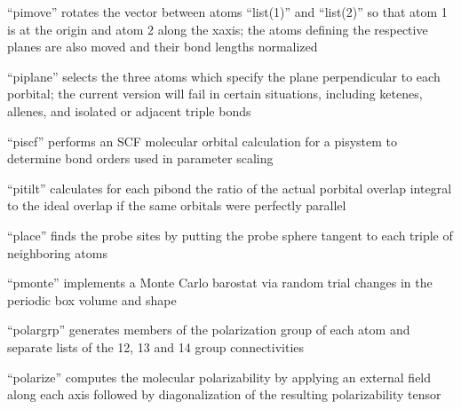 \documentclass[letterpaper,11pt,english]{sphinxmanual}
\begin{document}
\sphinxAtStartPar
{}

\sphinxAtStartPar
“pimove” rotates the vector between atoms “list(1)” and “list(2)” so that atom 1 is at the origin and atom 2 along the x\sphinxhyphen{}axis; the atoms defining the respective planes are also moved and their bond lengths normalized

\sphinxAtStartPar
{}

\sphinxAtStartPar
“piplane” selects the three atoms which specify the plane perpendicular to each p\sphinxhyphen{}orbital; the current version will fail in certain situations, including ketenes, allenes, and isolated or adjacent triple bonds

\sphinxAtStartPar
{}

\sphinxAtStartPar
“piscf” performs an SCF molecular orbital calculation for a pisystem to determine bond orders used in parameter scaling

\sphinxAtStartPar
{}

\sphinxAtStartPar
“pitilt” calculates for each pibond the ratio of the actual p\sphinxhyphen{}orbital overlap integral to the ideal overlap if the same orbitals were perfectly parallel

\sphinxAtStartPar
{}

\sphinxAtStartPar
“place” finds the probe sites by putting the probe sphere tangent to each triple of neighboring atoms

\sphinxAtStartPar
{}

\sphinxAtStartPar
“pmonte” implements a Monte Carlo barostat via random trial changes in the periodic box volume and shape

\sphinxAtStartPar
{}

\sphinxAtStartPar
“polargrp” generates members of the polarization group of each atom and separate lists of the 1\sphinxhyphen{}2, 1\sphinxhyphen{}3 and 1\sphinxhyphen{}4 group connectivities

\sphinxAtStartPar
{}

\sphinxAtStartPar
“polarize” computes the molecular polarizability by applying an external field along each axis followed by diagonalization of the resulting polarizability tensor

\sphinxAtStartPar
{}
\end{document}
